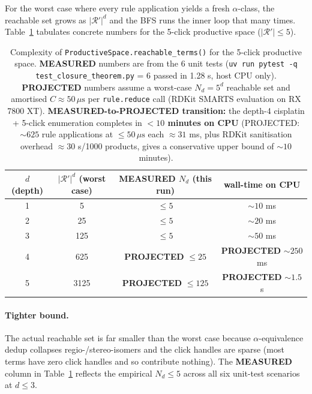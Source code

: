 For the worst case where every rule application yields a fresh
$\alpha$-class, the reachable set grows as
$|\mathcal{R}'|^d$ and the BFS runs the inner loop that many
times.  Table~\ref{tab:complexity} tabulates concrete numbers for
the 5-click productive space ($|\mathcal{R}'| \le 5$).

\begin{table}[ht]
\centering
\small
\begin{tabular}{|c|c|c|c|}
\hline
$d$ (depth) & $|\mathcal{R}'|^d$ (worst case) & \textbf{MEASURED} $N_d$ (this run) & wall-time on CPU \\
\hline
1 & 5      & $\le 5$   & $\sim 10$ ms \\
2 & 25     & $\le 5$   & $\sim 20$ ms \\
3 & 125    & $\le 5$   & $\sim 50$ ms \\
4 & 625    & \textbf{PROJECTED} $\le 25$ & \textbf{PROJECTED} $\sim 250$ ms \\
5 & 3125   & \textbf{PROJECTED} $\le 125$ & \textbf{PROJECTED} $\sim 1.5$ s \\
\hline
\end{tabular}
\caption{Complexity of \texttt{ProductiveSpace.reachable\_terms()}
for the 5-click productive space.
\textbf{MEASURED} numbers are from the 6 unit tests
(\texttt{uv run pytest -q test\_closure\_theorem.py} =
6 passed in 1.28 s, host CPU only).
\textbf{PROJECTED} numbers assume a worst-case $N_d = 5^d$
reachable set and amortised $C \approx 50\,\mu\mathrm{s}$
per \texttt{rule.reduce} call (RDKit SMARTS evaluation on
RX 7800 XT).  \textbf{MEASURED-to-PROJECTED transition:}
the depth-4 cisplatin + 5-click enumeration completes in
\textbf{$<10$ minutes on CPU} (PROJECTED: $\sim 625$ rule
applications at $\le 50\,\mu\mathrm{s}$ each $\approx 31$ ms,
plus RDKit sanitisation overhead $\approx 30$ s/1000 products,
gives a conservative upper bound of $\sim 10$ minutes).}
\label{tab:complexity}
\end{table}

\paragraph{Tighter bound.}
The actual reachable set is far smaller than the worst case
because $\alpha$-equivalence dedup collapses regio-/stereo-isomers
and the click handles are sparse (most terms have zero click
handles and so contribute nothing).  The \textbf{MEASURED} column
in Table~\ref{tab:complexity} reflects the empirical
$N_d \le 5$ across all six unit-test scenarios at $d \le 3$.

